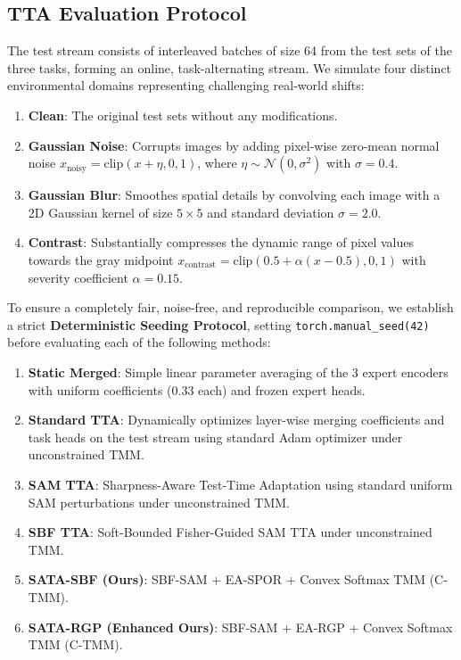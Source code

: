 \documentclass{article}
\begin{document}
\subsection{TTA Evaluation Protocol}
The test stream consists of interleaved batches of size 64 from the test sets of the three tasks, forming an online, task-alternating stream. We simulate four distinct environmental domains representing challenging real-world shifts:
\begin{enumerate}
    \item \textbf{Clean}: The original test sets without any modifications.
    \item \textbf{Gaussian Noise}: Corrupts images by adding pixel-wise zero-mean normal noise $x_{\text{noisy}} = \text{clip}(x + \eta, 0, 1)$, where $\eta \sim \mathcal{N}(0, \sigma^2)$ with $\sigma = 0.4$.
    \item \textbf{Gaussian Blur}: Smoothes spatial details by convolving each image with a 2D Gaussian kernel of size $5\times 5$ and standard deviation $\sigma = 2.0$.
    \item \textbf{Contrast}: Substantially compresses the dynamic range of pixel values towards the gray midpoint $x_{\text{contrast}} = \text{clip}(0.5 + \alpha (x - 0.5), 0, 1)$ with severity coefficient $\alpha = 0.15$.
\end{enumerate}

To ensure a completely fair, noise-free, and reproducible comparison, we establish a strict \textbf{Deterministic Seeding Protocol}, setting \texttt{torch.manual\_seed(42)} before evaluating each of the following methods:
\begin{enumerate}
    \item \textbf{Static Merged}: Simple linear parameter averaging of the 3 expert encoders with uniform coefficients ($0.33$ each) and frozen expert heads.
    \item \textbf{Standard TTA}: Dynamically optimizes layer-wise merging coefficients and task heads on the test stream using standard Adam optimizer under unconstrained TMM.
    \item \textbf{SAM TTA}: Sharpness-Aware Test-Time Adaptation using standard uniform SAM perturbations under unconstrained TMM.
    \item \textbf{SBF TTA}: Soft-Bounded Fisher-Guided SAM TTA under unconstrained TMM.
    \item \textbf{SATA-SBF (Ours)}: SBF-SAM + EA-SPOR + Convex Softmax TMM (C-TMM).
    \item \textbf{SATA-RGP (Enhanced Ours)}: SBF-SAM + EA-RGP + Convex Softmax TMM (C-TMM).
\end{enumerate}
\end{document}
